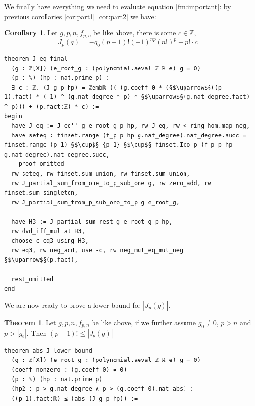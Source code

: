 \documentclass{report}
\theoremstyle{definition}
\newtheorem{theorem}{Theorem}[section]
\newtheorem{corollary}{Corollary}[section]
\begin{document}
We finally have everything we need to evaluate equation \ref{fm:important}: by previous corollaries \ref{cor:part1} \ref{cor:part2} we have:
\begin{corollary}
Let $g,p,n,f_{p,n}$ be like above, there is some $c\in\mathbb Z$,
$$
J_p(g)=-g_0(p-1)!(-1)^{np} (n!)^p + p!\cdot c
$$
\begin{verbatim}
theorem J_eq_final 
  (g : ℤ[X]) (e_root_g : (polynomial.aeval ℤ ℝ e) g = 0) 
  (p : ℕ) (hp : nat.prime p) : 
  ∃ c : ℤ, (J g p hp) = ℤembℝ ((-(g.coeff 0 * (§$\uparrow$§((p - 1).fact) * (-1) ^ (g.nat_degree * p) * §$\uparrow$§(g.nat_degree.fact) ^ p))) + (p.fact:ℤ) * c) :=
begin
  have J_eq := J_eq'' g e_root_g p hp, rw J_eq, rw <-ring_hom.map_neg,
  have seteq : finset.range (f_p p hp g.nat_degree).nat_degree.succ = finset.range (p-1) §$\cup$§ {p-1} §$\cup$§ finset.Ico p (f_p p hp g.nat_degree).nat_degree.succ,
    proof_omitted
  rw seteq, rw finset.sum_union, rw finset.sum_union, 
  rw J_partial_sum_from_one_to_p_sub_one g, rw zero_add, rw finset.sum_singleton,
  rw J_partial_sum_from_p_sub_one_to_p g e_root_g,
  
  have H3 := J_partial_sum_rest g e_root_g p hp,
  rw dvd_iff_mul at H3,
  choose c eq3 using H3,
  rw eq3, rw neg_add, use -c, rw neg_mul_eq_mul_neg §$\uparrow$§(p.fact),

  rest_omitted
end
\end{verbatim}
\end{corollary}

We are now ready to prove a lower bound for $|J_p(g)|$.
\begin{theorem}
Let $g,p,n,f_{p,n}$ be like above, if we further assume $g_0\ne 0$, $p>n$ and $p>|g_0|$. Then $(p-1)!\le |J_p(g)|$
\begin{verbatim}
theorem abs_J_lower_bound 
  (g : ℤ[X]) (e_root_g : (polynomial.aeval ℤ ℝ e) g = 0) 
  (coeff_nonzero : (g.coeff 0) ≠ 0) 
  (p : ℕ) (hp : nat.prime p) 
  (hp2 : p > g.nat_degree ∧ p > (g.coeff 0).nat_abs) : 
  ((p-1).fact:ℝ) ≤ (abs (J g p hp)) :=
\end{verbatim}
\end{theorem}
\end{document}
